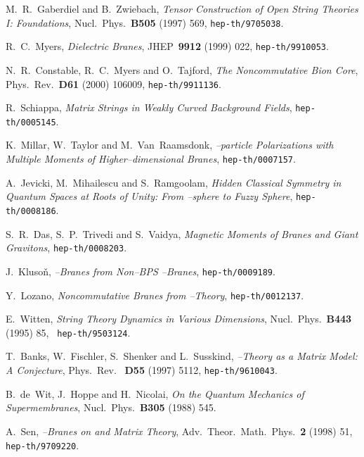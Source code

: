 \documentclass[a4paper,11pt]{article}
\begin{document}
\begin{thebibliography}{99}
{  {\small M.~R.~Gaberdiel and B.~Zwiebach, \textit{Tensor
Construction of Open String Theories I: Foundations}, Nucl.\ Phys.\
\textbf{B505} (1997) 569, \texttt{hep-th/9705038}. }

  {\small R.~C.~Myers, \textit{Dielectric Branes}, JHEP\ 
\textbf{9912} (1999) 022, \texttt{hep-th/9910053}. }

  {\small N.~R.~Constable, R.~C.~Myers and O.~Tajford, \textit{
The Noncommutative Bion Core}, Phys.\ Rev.\ \textbf{D61} (2000) 106009, 
\texttt{hep-th/9911136}. }

  {\small R.~Schiappa, \textit{Matrix Strings in Weakly
Curved Background Fields}, \texttt{hep-th/0005145}. }

  {\small K.~Millar, W.~Taylor and M.~Van~Raamsdonk, \textit{
\coordHE{}--particle Polarizations with Multiple Moments of Higher--dimensional 
Branes}, \texttt{hep-th/0007157}. }

  {\small A.~Jevicki, M.~Mihailescu and S.~Ramgoolam, \textit{
Hidden Classical Symmetry in Quantum Spaces at Roots of Unity: From 
\myHighlight{$q$}\coordHE{}--sphere to Fuzzy Sphere}, \texttt{hep-th/0008186}. }

\bibitem{DTV}  {\small S.~R.~Das, S.~P.~Trivedi and S.~Vaidya, \textit{
Magnetic Moments of Branes and Giant Gravitons}, \texttt{hep-th/0008203}. }

\bibitem{Kluson}  {\small J.~Kluso\v{n}, \textit{\myHighlight{$D$}\coordHE{}--Branes from \coordHE{}
Non--BPS \coordHE{}--Branes}, \texttt{hep-th/0009189}. }

\bibitem{Lozano}  {\small Y.~Lozano, \textit{Noncommutative Branes 
from \coordHE{}--Theory}, \texttt{hep-th/0012137}. }

\bibitem{Witten-1}  {\small E.~Witten, \textit{String Theory Dynamics in
Various Dimensions}, Nucl.\ Phys.\ \textbf{B443} (1995) 85, \texttt{
hep-th/9503124}. }

  {\small T.~Banks, W.~Fischler, S.~Shenker and L.~Susskind, 
\textit{\coordHE{}--Theory as a Matrix Model: A Conjecture}, Phys.\ Rev.\ \textbf{
D55} (1997) 5112, \texttt{hep-th/9610043}. }

  {\small B.~de~Wit, J.~Hoppe and H.~Nicolai, \textit{On the
Quantum Mechanics of Supermembranes}, Nucl.\ Phys.\ \textbf{B305} (1988)
545. }

  {\small A.~Sen, \textit{\coordHE{}--Branes on \coordHE{} and Matrix
Theory}, Adv.\ Theor.\ Math.\ Phys.\ \textbf{2} (1998) 51, \texttt{
hep-th/9709220}. }

}
\end{thebibliography}
\end{document}
